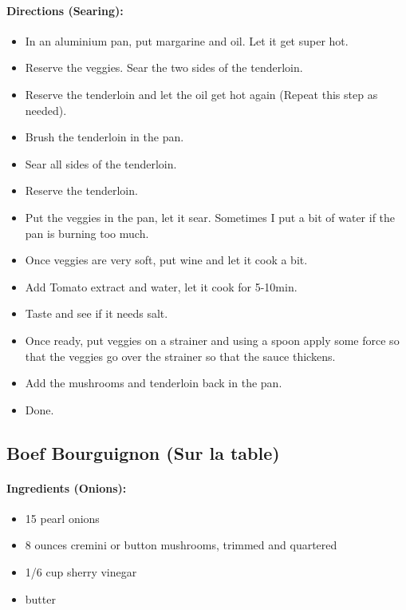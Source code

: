 \documentclass{article}
\begin{document}
\paragraph{Directions (Searing):}
\begin{itemize}
    \item In an aluminium pan, put margarine and oil. Let it get super hot.
    \item Reserve the veggies. Sear the two sides of the tenderloin.
    \item Reserve the tenderloin and let the oil get hot again (Repeat this step as needed).
    \item Brush the tenderloin in the pan.
    \item Sear all sides of the tenderloin.
    \item Reserve the tenderloin.
    \item Put the veggies in the pan, let it sear. Sometimes I put a bit of water if the pan is burning too much.
    \item Once veggies are very soft, put wine and let it cook a bit.
    \item Add Tomato extract and water, let it cook for 5-10min.
    \item Taste and see if it needs salt.
    \item Once ready, put veggies on a strainer and using a spoon apply some force so that the veggies go over the strainer so that the sauce thickens.
    \item Add the mushrooms and tenderloin back in the pan.
    \item Done.
\end{itemize} 

\subsection{Boef Bourguignon (Sur la table)} 

\paragraph{Ingredients (Onions):}
\begin{itemize}
    \item 15 pearl onions
    \item 8 ounces cremini or button mushrooms, trimmed and quartered
    \item 1/6 cup sherry vinegar
    \item butter
\end{itemize}  
\end{document}
